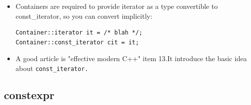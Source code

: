 \documentclass[a4paper,11pt,twoside]{book}
\begin{document}
\begin{itemize}
	\item Containers are required to provide iterator as a type convertible to const\_iterator, so you can convert implicitly:
\begin{lstlisting}	
Container::iterator it = /* blah */;
Container::const_iterator cit = it;	
\end{lstlisting}

	\item A good article is "effective modern C++" item 13.It introduce the basic idea about \texttt{const\_iterator.}
\end{itemize}

\subsection{constexpr}
\end{document}
